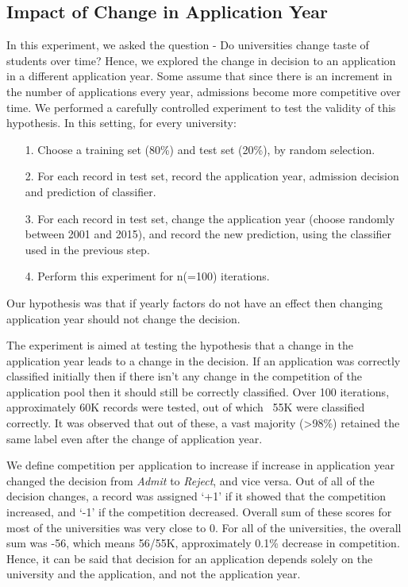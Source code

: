 \documentclass{sig-alternate-05-2015}
\begin{document}
\subsection{Impact of Change in Application Year}
\label{subsec:year-change-exp}
In this experiment, we asked the question - Do universities change taste of students over time? Hence, we explored the change in decision to an application in a different application year. Some assume that since there is an increment in the number of applications every year, admissions become more competitive over time. We performed a carefully controlled experiment to test the validity of this hypothesis. In this setting, for every university:
\begin{itemize}
\item[1.]Choose a training set (80\%) and test set (20\%), by random selection.
\item[2.]For each record in test set, record the application year, admission decision and prediction of classifier.
\item[3.]For each record in test set, change the application year (choose randomly between 2001 and 2015), and record the new prediction, using the classifier used in the previous step.
\item[4.]Perform this experiment for n(=100) iterations.
\end{itemize}
Our hypothesis was that if yearly factors do not have an effect then changing application year should not change the decision.

The experiment is aimed at testing the hypothesis that a change in the application year leads to a change in the decision. If an application was correctly classified initially then if there isn't any change in the competition of the application pool then it should still be correctly classified. Over 100 iterations, approximately 60K records were tested, out of which ~55K were classified correctly. It was observed that out of these, a vast majority (>98\%) retained the same label even after the change of application year.

We define competition per application to increase if increase in application year changed the decision from \textit{Admit} to \textit{Reject}, and vice versa. Out of all of the decision changes, a record was assigned `+1' if it showed that the competition increased, and `-1' if the competition decreased. Overall sum of these scores for most of the universities was very close to 0. For all of the universities, the overall sum was -56, which means 56/55K, approximately 0.1\% decrease in competition. Hence, it can be said that decision for an application depends solely on the university and the application, and not the application year.\\
\end{document}
